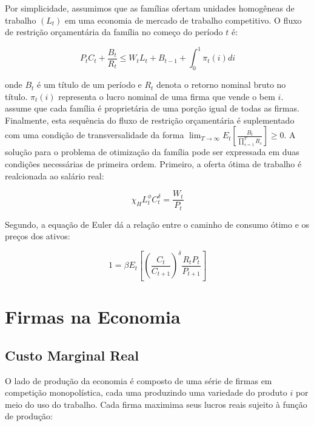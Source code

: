 \documentclass[twoside,a4paper,11pt]{report}
\begin{document}
Por simplicidade, assumimos que as famílias ofertam unidades homogêneas de trabalho $(L_{t})$ em uma economia de mercado de trabalho competitivo. O fluxo de restrição orçamentária da família no começo do período $t$ é:

\begin{equation}\label{eq06en03}
{P}_{t}{C}_{t}+\frac{{B}_{t}}{{R}_{t}}\le{W}_{t}{L}_{t}+{B}_{t-1}+\int _{0}^{1}{{\pi}_{t}(i)di} 
\end{equation}

\noindent onde ${B}_{t}$ é um título de um período e $R_{t}$ denota o retorno nominal bruto no título. ${\pi}_{t}(i)$ representa o lucro nominal de uma firma que vende o bem $i$. \citet{yao2010aggregate} assume que cada família é proprietária de uma porção igual de todas as firmas. Finalmente, esta sequência do fluxo de restrição orçamentária é suplementado com uma condição de transversalidade da forma $\lim _{T\rightarrow \infty}{{E}_{t}[\frac{{B}_{t}}{\prod _{s=1}^{T}{R_{s}}}]} \ge 0$. A solução para o problema de otimização da família pode ser expressada em duas condições necessárias de primeira ordem. Primeiro, a oferta ótima de trabalho é realcionada ao salário real:

\begin{equation}\label{eq07en03}
{\chi}_{H}{L}_{t}^{\phi}{C}_{t}^{\delta}=\frac{{W}_{t}}{{P}_{t}} 
\end{equation}

Segundo, a equação de Euler dá a relação entre o caminho de consumo ótimo e os preços dos ativos:

\begin{equation}\label{eq08en03}
1=\beta {E}_{t}[{(\frac{{C}_{t}}{{C}_{t+1}})}^{\delta}\frac{{R}_{t}{P}_{t}}{{P}_{t+1}}] 
\end{equation}


\section*{Firmas na Economia}

\subsection*{Custo Marginal Real}

O lado de produção da economia é composto de uma série de firmas em competição monopolística, cada uma produzindo uma variedade do produto $i$ por meio do uso do trabalho. Cada firma maximima seus lucros reais sujeito à função de produção:
\end{document}
